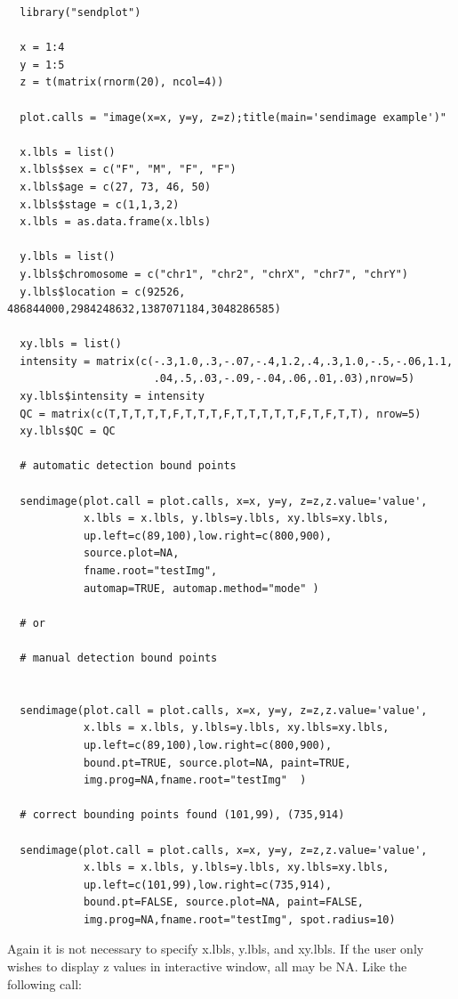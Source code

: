 \documentclass[]{article}
\begin{document}
\begin{verbatim}
  library("sendplot")

  x = 1:4
  y = 1:5
  z = t(matrix(rnorm(20), ncol=4))

  plot.calls = "image(x=x, y=y, z=z);title(main='sendimage example')"

  x.lbls = list()
  x.lbls$sex = c("F", "M", "F", "F")
  x.lbls$age = c(27, 73, 46, 50)
  x.lbls$stage = c(1,1,3,2)
  x.lbls = as.data.frame(x.lbls)
  
  y.lbls = list()
  y.lbls$chromosome = c("chr1", "chr2", "chrX", "chr7", "chrY")
  y.lbls$location = c(92526, 486844000,2984248632,1387071184,3048286585)
  
  xy.lbls = list()
  intensity = matrix(c(-.3,1.0,.3,-.07,-.4,1.2,.4,.3,1.0,-.5,-.06,1.1,
                       .04,.5,.03,-.09,-.04,.06,.01,.03),nrow=5)
  xy.lbls$intensity = intensity
  QC = matrix(c(T,T,T,T,T,F,T,T,T,F,T,T,T,T,T,F,T,F,T,T), nrow=5)
  xy.lbls$QC = QC

  # automatic detection bound points

  sendimage(plot.call = plot.calls, x=x, y=y, z=z,z.value='value',
            x.lbls = x.lbls, y.lbls=y.lbls, xy.lbls=xy.lbls,
            up.left=c(89,100),low.right=c(800,900),
            source.plot=NA, 
            fname.root="testImg",
            automap=TRUE, automap.method="mode" )

  # or 

  # manual detection bound points


  sendimage(plot.call = plot.calls, x=x, y=y, z=z,z.value='value',
            x.lbls = x.lbls, y.lbls=y.lbls, xy.lbls=xy.lbls,
            up.left=c(89,100),low.right=c(800,900),
            bound.pt=TRUE, source.plot=NA, paint=TRUE,
            img.prog=NA,fname.root="testImg"  )

  # correct bounding points found (101,99), (735,914)

  sendimage(plot.call = plot.calls, x=x, y=y, z=z,z.value='value',
            x.lbls = x.lbls, y.lbls=y.lbls, xy.lbls=xy.lbls,
            up.left=c(101,99),low.right=c(735,914),
            bound.pt=FALSE, source.plot=NA, paint=FALSE,
            img.prog=NA,fname.root="testImg", spot.radius=10)

\end{verbatim}


Again it is not necessary to specify x.lbls, y.lbls, and xy.lbls. If the user only wishes to display z values in interactive window, all may be NA. Like the following call:
\end{document}
